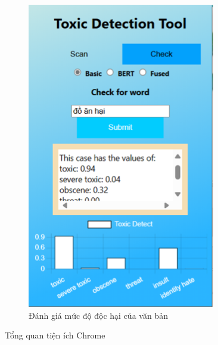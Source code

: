 \begin{figure}[htb!]
\begin{subfigure}[b]{0.33\textwidth}
        \includegraphics[width=0.9\textwidth]{image/ex_text_eval.png}
        \caption{Đánh giá mức độ độc hại của văn bản}
        \label{figure:ex_text_eval}
    \end{subfigure}
    \caption{Tổng quan tiện ích Chrome}
\end{figure}


